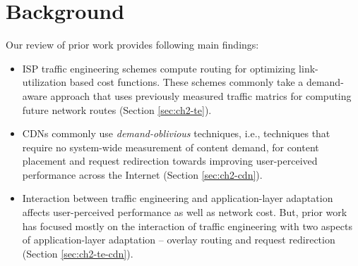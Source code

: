 

\section{Background}
\label{sec:bg-bg}
Our review of prior work provides following main findings:

\begin{itemize}
	\item ISP traffic engineering schemes compute routing for optimizing link-utilization based cost functions. These schemes commonly take a demand-aware approach that uses previously measured traffic matrics for computing future network routes (Section \ref{sec:ch2-te}).	
	\item CDNs commonly use \emph{demand-oblivious} techniques, i.e., techniques that require no system-wide measurement of content demand, for content placement and request redirection towards improving user-perceived performance across the Internet (Section \ref{sec:ch2-cdn}).
	\item Interaction between traffic engineering and application-layer adaptation affects user-perceived performance as well as network cost. But, prior work has focused mostly on the interaction of traffic engineering with two aspects of application-layer adaptation --  overlay routing and request redirection (Section \ref{sec:ch2-te-cdn}).
\end{itemize}


